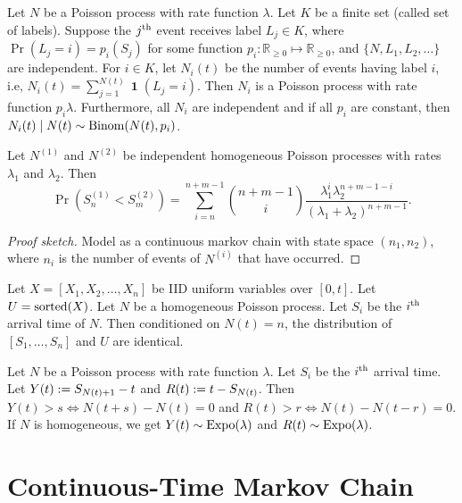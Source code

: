 \documentclass[a4paper, 12pt, fleqn]{article}
\DeclareMathOperator{\boolone}{\mathbf{1}}
\DeclareMathOperator{\Expo}{\opname{Expo}}
\begin{document}
\begin{theorem}
Let $N$ be a Poisson process with rate function $\lambda$. Let $K$ be a finite set (called set of labels).
Suppose the $j^{\textrm{th}}$ event receives label $L_j \in K$, where $\Pr(L_j = i) = p_i(S_j)$
for some function $p_i: \mathbb{R}_{\ge 0} \mapsto \mathbb{R}_{\ge 0}$,
and $\{N, L_1, L_2, \ldots\}$ are independent.
For $i \in K$, let $N_i(t)$ be the number of events having label $i$, i.e,
$N_i(t) = \sum_{j=1}^{N(t)} \boolone(L_j = i)$.
Then $N_i$ is a Poisson process with rate function $p_i \lambda$.
Furthermore, all $N_i$ are independent and if all $p_i$ are constant, then
$N_i(t) \mid N(t) \sim \operatorname{Binom}(N(t), p_i)$.
\end{theorem}

\begin{lemma}
Let $N^{(1)}$ and $N^{(2)}$ be independent homogeneous Poisson processes
with rates $\lambda_1$ and $\lambda_2$. Then
\[ \Pr(S^{(1)}_n < S^{(2)}_m) = \sum_{i=n}^{n+m-1} \binom{n+m-1}{i}
    \frac{\lambda_1^i\lambda_2^{n+m-1-i}}{(\lambda_1 + \lambda_2)^{n+m-1}}. \]
\end{lemma}
\begin{proof}[Proof sketch]
Model as a continuous markov chain with state space $(n_1, n_2)$,
where $n_i$ is the number of events of $N^{(i)}$ that have occurred.
\end{proof}

\begin{theorem}
Let $X = [X_1, X_2, \ldots, X_n]$ be IID uniform variables over $[0, t]$.
Let $U = \operatorname{sorted}(X)$. Let $N$ be a homogeneous Poisson process.
Let $S_i$ be the $i^{\textrm{th}}$ arrival time of $N$.
Then conditioned on $N(t) = n$, the distribution of $[S_1, \ldots, S_n]$ and $U$ are identical.
\end{theorem}

\begin{lemma}
Let $N$ be a Poisson process with rate function $\lambda$.
Let $S_i$ be the $i^{\textrm{th}}$ arrival time.
Let $Y(t) := S_{N(t)+1}-t$ and $R(t) := t - S_{N(t)}$.
Then $Y(t) > s \iff N(t+s)-N(t) = 0$ and $R(t) > r \iff N(t)-N(t-r) = 0$.
If $N$ is homogeneous, we get $Y(t) \sim \Expo(\lambda)$ and $R(t) \sim \Expo(\lambda)$.
\end{lemma}

\section{Continuous-Time Markov Chain}
\end{document}
